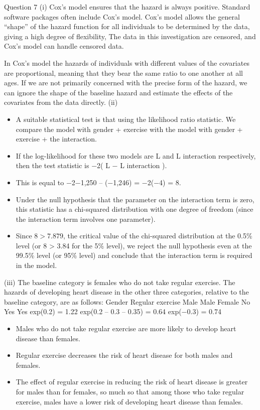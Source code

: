 \documentclass[a4paper,12pt]{article}
\begin{document}
\begin{enumerate}






\newpage

Question 7
(i)
Cox’s model ensures that the hazard is always positive.
Standard software packages often include Cox’s model.
Cox’s model allows the general “shape” of the hazard function for all individuals to be determined by the data, giving a high degree of flexibility, The data in this investigation are censored, and Cox’s model can handle censored data.

In Cox’s model the hazards of individuals with different values of the covariates are proportional, meaning that they bear the same ratio to one another at all ages.
If we are not primarily concerned with the precise form of the hazard, we can ignore
the shape of the baseline hazard and estimate the effects of the covariates from
the data directly.
(ii)
\begin{itemize}
\item A suitable statistical test is that using the likelihood ratio statistic.
We compare the model with gender + exercise with the model with gender + exercise +
the interaction.
\item If the log-likelihood for these two models are L and L interaction respectively, then the test
statistic is −2( L − L interaction ).
\item This is equal to −2{−1,250 – (−1,246)} = −2(−4) = 8.
\item Under the null hypothesis that the parameter on the interaction term is zero, this statistic has a chi-squared distribution with one degree of freedom (since the interaction term
involves one parameter).
\item Since $8 > 7.879$, the critical value of the chi-squared distribution at the 0.5\% level (or 8
> 3.84 for the 5\% level),
we reject the null hypothesis even at the 99.5\% level (or 95\% level) and conclude that
the interaction term is required in the model.
\end{itemize}
(iii)
The baseline category is females who do not take regular exercise.
The hazards of developing heart disease in the other three categories, relative to the
baseline category, are as follows:
Gender Regular exercise
Male
Male
Female No
Yes
Yes
exp(0.2) = 1.22
exp(0.2 – 0.3 – 0.35) = 0.64
exp(−0.3) = 0.74
\begin{itemize}
\item Males who do not take regular exercise are more likely to develop heart disease than
females.
\item Regular exercise decreases the risk of heart disease for both males and females.
\item The effect of regular exercise in reducing the risk of heart disease is greater for males
than for females, so much so that among those who take regular exercise, males have a
lower risk of developing heart disease than females.
\end{itemize}


\end{enumerate}
\end{document}
